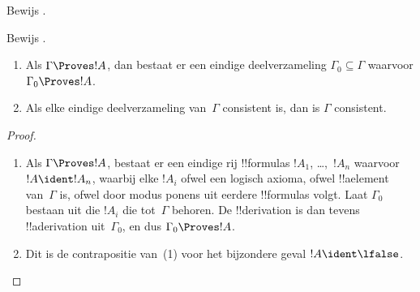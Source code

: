 \documentclass[openany]{memoir}
\begin{document}
\begin{prob}
Bewijs .
\end{prob}
\tagendprob

\begin{prob}
Bewijs .
\end{prob}
\tagendprob

\begin{prop}[Compactheid]
  \begin{enumerate}
  \item Als $\Gamma \Proves !A$, dan bestaat er een eindige
    deelverzameling $\Gamma_0 \subseteq \Gamma$ waarvoor
    $\Gamma_0 \Proves !A$.
  \item Als elke eindige deelverzameling van~$\Gamma$ consistent is,
    dan is $\Gamma$ consistent.
  \end{enumerate}
\end{prop}

\begin{proof}
  \begin{enumerate}
    \item Als $\Gamma \Proves !A$, bestaat er een eindige rij
      !!{formula}s $!A_1$, \dots,~$!A_n$ waarvoor $!A \ident !A_n$,
      waarbij elke $!A_i$ ofwel een logisch axioma, ofwel !!a{element}
      van~$\Gamma$ is, ofwel door modus ponens uit eerdere
      !!{formula}s volgt. Laat $\Gamma_0$ bestaan uit die $!A_i$ die
      tot~$\Gamma$ behoren. De !!{derivation} is dan tevens
      !!a{derivation} uit~$\Gamma_0$, en dus $\Gamma_0 \Proves !A$.
    \item Dit is de contrapositie van~(1) voor het bijzondere geval
      $!A \ident \lfalse$.
\end{enumerate}
\end{proof}
\endgroup

\begingroup
\def\olfilename{OLP-0119}
\def\olfilepath{content/first-order-logic/axiomatic-deduction/}
\hypertarget{unit-OLP-0119}{}
\end{document}
